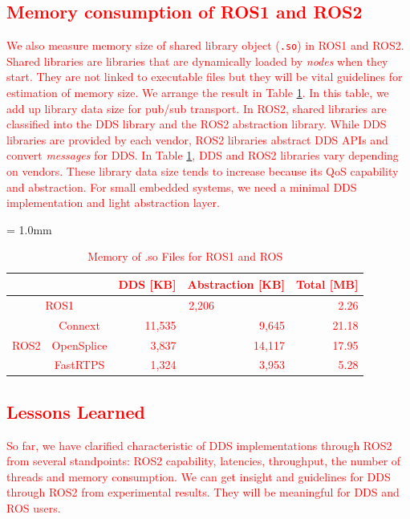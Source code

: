 \documentclass{sig-alternate-05-2015}
\begin{document}
\subsection{\textcolor{red}{Memory consumption of ROS1 and ROS2}}
\label{sec:throughput}
\textcolor{red}{
We also measure memory size of shared library object (\texttt{.so}) in ROS1 and ROS2.
Shared libraries are libraries that are dynamically loaded by \emph{nodes} when they start.
They are not linked to executable files but they will be vital guidelines for estimation of memory size.
We arrange the result in Table \ref{tb:memory}.
In this table, we add up library data size for pub/sub transport.
In ROS2, shared libraries are classified into the DDS library and the ROS2 abstraction library.
While DDS libraries are provided by each vendor, ROS2 libraries abstract DDS APIs and convert \emph{messages} for DDS.
In Table \ref{tb:memory}, DDS and ROS2 libraries vary depending on vendors.
These library data size tends to increase because its QoS capability and abstraction.
For small embedded systems, we need a minimal DDS implementation and light abstraction layer.
}
\begin{table}[t]
  \caption{\textcolor{red}{Memory of .so Files for ROS1 and ROS}}
  \centering
  \renewcommand{\arraystretch}{1.15}
  \label{tb:memory}
  \small
  \tabcolsep = 1.0mm              %
  \textcolor{red}{
  \begin{tabular}{c|c||r|r||r}
    \hline
    \multicolumn{2}{c||}{} & DDS [KB] & Abstraction [KB] & Total [MB] \\ \hline \hline
    \multicolumn{2}{c||}{ROS1}  & \multicolumn{2}{c||}{ 2,206 } & 2.26 \\ \hline
    \multirow{3}{*}{ROS2} & Connext & 11,535 & 9,645 & 21.18 \\ 
    & OpenSplice & 3,837 & 14,117 & 17.95 \\ 
    & FastRTPS & 1,324 & 3,953 & 5.28\\ \hline
  \end{tabular}
  }
  \vspace{-5mm}
\end{table}


\vspace{-1mm}
\subsection{\textcolor{red}{Lessons Learned}}
\label{sec:lessons}
\textcolor{red}{
So far, we have clarified characteristic of DDS implementations through ROS2 from several standpoints: ROS2 capability, latencies, throughput, the number of threads and memory consumption.
We can get insight and guidelines for DDS through ROS2 from experimental results.
They will be meaningful for DDS and ROS users.
}
\end{document}
